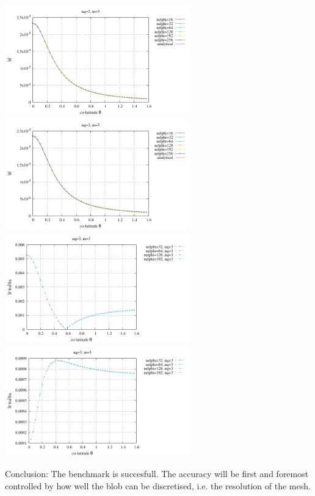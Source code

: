 \begin{center}
\includegraphics[width=8cm]{python_codes/fieldstone_152/RESULTS/exp2/gravity/nelr64/gravity.pdf}
\includegraphics[width=8cm]{python_codes/fieldstone_152/RESULTS/exp2/gravity/nelr96/gravity.pdf}\\
\includegraphics[width=8cm]{python_codes/fieldstone_152/RESULTS/exp2/gravity/nelr64/gravity_error.pdf}
\includegraphics[width=8cm]{python_codes/fieldstone_152/RESULTS/exp2/gravity/nelr96/gravity_error.pdf}\\
\end{center}

Conclusion: The benchmark is succesfull. 
The accuracy will be first and foremost controlled by how well the blob can be discretised, 
i.e. the resolution of the mesh. 





